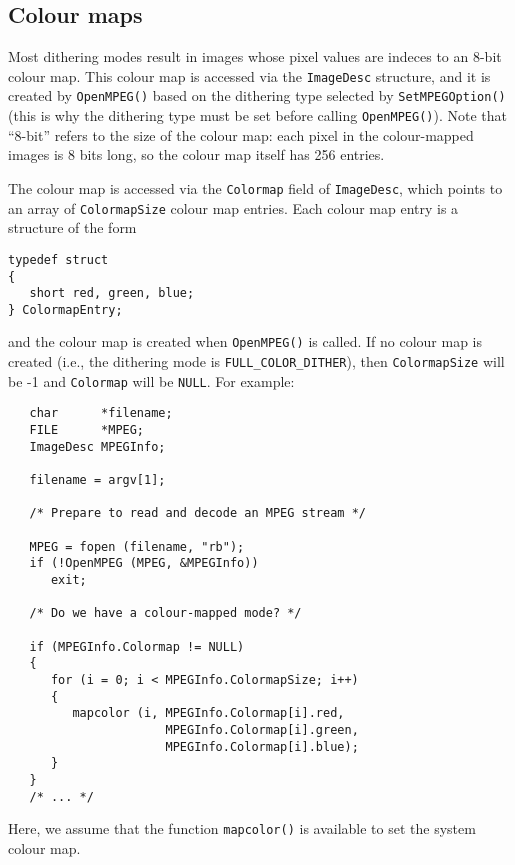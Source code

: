 \documentclass[11pt]{article}
\newcommand{\code}[1]{\texttt{#1}}
\begin{document}
\subsection{Colour maps}
\label{sec:colour_maps}

Most dithering modes result in images whose pixel values are indeces to an
8-bit colour map.  This colour map is accessed via the \code{ImageDesc}
structure, and it is created by \code{OpenMPEG()} based on the dithering type
selected by \code{SetMPEGOption()} (this is why the dithering type must be
set before calling \code{OpenMPEG()}).  Note that ``8-bit'' refers to
the size of the colour map: each pixel in the colour-mapped images is 8
bits long, so the colour map itself has 256 entries.

The colour map is accessed via the \code{Colormap} field of
\code{ImageDesc}, which points to an array of \code{ColormapSize}
colour map entries.  Each colour map entry is a structure of the form
\begin{verbatim}
typedef struct
{
   short red, green, blue;
} ColormapEntry;
\end{verbatim}
and the colour map is created when \code{OpenMPEG()} is called.  If no
colour map is created (i.e., the dithering mode is
\code{FULL\_COLOR\_DITHER}), then \code{ColormapSize} will be -1 and
\code{Colormap} will be \code{NULL}.  For example:
\begin{verbatim}
   char      *filename;
   FILE      *MPEG;
   ImageDesc MPEGInfo;

   filename = argv[1];

   /* Prepare to read and decode an MPEG stream */

   MPEG = fopen (filename, "rb");
   if (!OpenMPEG (MPEG, &MPEGInfo))
      exit;

   /* Do we have a colour-mapped mode? */

   if (MPEGInfo.Colormap != NULL)
   {
      for (i = 0; i < MPEGInfo.ColormapSize; i++)
      {
         mapcolor (i, MPEGInfo.Colormap[i].red,
                      MPEGInfo.Colormap[i].green,
                      MPEGInfo.Colormap[i].blue);
      }
   }
   /* ... */
\end{verbatim}
Here, we assume that the function \code{mapcolor()} is available to
set the system colour map.

\end{document}
